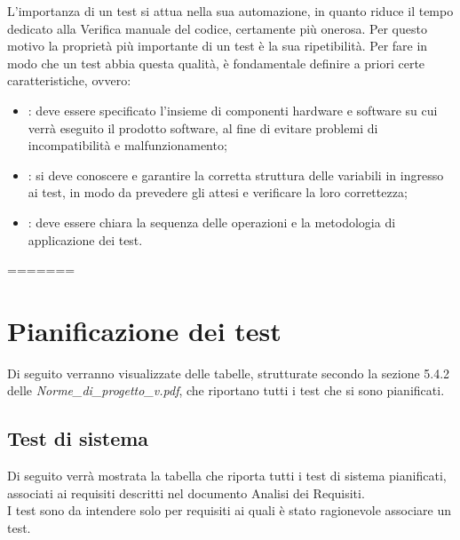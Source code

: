 L'importanza di un test si attua nella sua automazione, in quanto riduce il tempo dedicato alla Verifica manuale del codice, certamente più onerosa. Per questo motivo la proprietà più importante di un test è la sua ripetibilità.
Per fare in modo che un test abbia questa qualità, è fondamentale definire a priori certe caratteristiche, ovvero:
\begin{itemize}
\item {}: deve essere specificato l'insieme di componenti hardware e software su cui verrà eseguito il prodotto software, al fine di evitare problemi di incompatibilità e malfunzionamento;
\item {}: si deve conoscere e garantire la corretta struttura delle variabili in ingresso ai test, in modo da prevedere gli  attesi e verificare la loro correttezza;
\item {}: deve essere chiara la sequenza delle operazioni e la metodologia di applicazione dei test.
\end{itemize}
=======
\section{Pianificazione dei test}
Di seguito verranno visualizzate delle tabelle, strutturate secondo la sezione 5.4.2 delle  \emph{Norme\_di\_progetto\_v\versioneNormeDiProgetto{}.pdf}, che riportano tutti i test che si sono pianificati. \\
\subsection{Test di sistema}
Di seguito verrà mostrata la tabella che riporta tutti i test di sistema pianificati, associati ai requisiti descritti nel documento Analisi dei Requisiti.\\
I test sono da intendere solo per requisiti ai quali è stato ragionevole associare un test.
